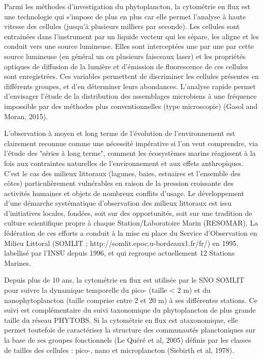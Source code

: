 \documentclass[12pt]{article}
\begin{document}
Parmi les méthodes d’investigation du phytoplancton, la cytométrie en flux est une technologie qui s’impose de plus en plus car elle permet l’analyse à haute vitesse des cellules (jusqu’à plusieurs milliers par seconde). Les cellules sont entrainées dans l’instrument par un liquide vecteur qui les sépare, les aligne et les conduit vers une source lumineuse. Elles sont interceptées une par une par cette source lumineuse (en général un ou plusieurs faisceaux laser) et les propriétés optiques de diffusion de la lumière et d’émission de fluorescence de ces cellules sont enregistrées. Ces variables permettent de discriminer les cellules présentes en différents groupes, et d’en déterminer leurs abondances. L’analyse rapide permet d’envisager l’étude de la distribution des assemblages
microbiens à une fréquence impossible par des méthodes plus conventionnelles (type microscopie) (Gasol and Moran, 2015).

L’observation à moyen et long terme de l’évolution de l’environnement est clairement reconnue comme une nécessité impérative si l’on veut comprendre, via l’étude des "séries à long terme", comment les écosystèmes marins réagissent à la fois aux contraintes naturelles de l’environnement et aux effets anthropiques. C’est le cas des milieux littoraux (lagunes, baies, estuaires et l’ensemble des côtes) particulièrement vulnérables en raison de la pression croissante des activités humaines et objets de nombreux conflits d’usage. Le développement d’une démarche systématique d’observation des milieux littoraux est issu d’initiatives locales, fondées, soit sur des opportunités, soit sur une tradition de culture scientifique propre à chaque Station/Laboratoire Marin (RESOMAR). La fédération de ces efforts a conduit à la mise en place du Service d’Observation en Milieu Littoral (SOMLIT ; http://somlit.epoc.u-bordeaux1.fr/fr/) en 1995, labellisé par l’INSU depuis 1996, et qui regroupe actuellement 12 Stations Marines.

Depuis plus de 10 ans, la cytométrie en flux est utilisée par le SNO SOMLIT pour suivre la dynamique temporelle du pico- (taille < 2 m) et du nanophytoplancton (taille comprise entre 2 et 20 m) à ses différentes stations. Ce suivi est complémentaire du suivi taxonomique du phytoplancton de plus grande taille du réseau PHYTOBS. Si la cytométrie en flux est ataxonomique, elle permet toutefois de caractériser la structure des communautés planctoniques sur la base de ses groupes fonctionnels (Le Quéré et al, 2005) définis par les classes de tailles des cellules : pico-, nano et microplancton (Siebirth et al, 1978).
\end{document}
